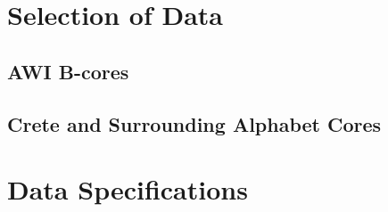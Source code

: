 \documentclass[../../CompleteThesis/Complete_1stDraft]{subfiles}
\begin{document}
\section[Selection][Selection]{Selection of Data}
\label{Sec:Data_Selection}
\subsection[AWI B-cores]{AWI B-cores}
\label{Subsec:Data_Selection_Bcores}
\subsection[Crete Area][Crete Area]{Crete and Surrounding Alphabet Cores}
\label{Subsec:Data_Selection_Alhabet}
\section[Data Specifications][Data Specifications]{Data Specifications}
\label{Sec:Data_Specifications}
\end{document}

